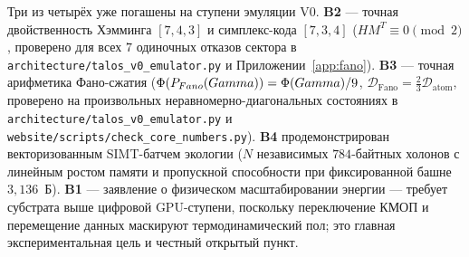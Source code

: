 Три из четырёх уже погашены на ступени эмуляции V0. \textbf{B2} --- точная
двойственность Хэмминга $[7,4,3]$ и симплекс-кода $[7,3,4]$
($HM^T\equiv 0\pmod 2$, проверено для всех $7$ одиночных отказов сектора в
\texttt{architecture/talos\_v0\_emulator.py} и Приложении~\ref{app:fano}).
\textbf{B3} --- точная арифметика Фано-сжатия
($\Phi(P_{Fano}(Gamma))=\Phi(Gamma)/9$,
$\mathcal{D}_{\mathrm{Fano}}=\tfrac23\mathcal{D}_{\mathrm{atom}}$, проверено
на произвольных неравномерно-диагональных состояниях в
\texttt{architecture/talos\_v0\_emulator.py} и
\texttt{website/scripts/check\_core\_numbers.py}). \textbf{B4} продемонстрирован
векторизованным SIMT-батчем экологии ($N$ независимых $784$-байтных холонов с
линейным ростом памяти и пропускной способности при фиксированной башне
$3{,}136$~Б). \textbf{B1} --- заявление о физическом масштабировании энергии ---
требует субстрата выше цифровой GPU-ступени, поскольку переключение КМОП и
перемещение данных маскируют термодинамический пол; это главная
экспериментальная цель и честный открытый пункт.
